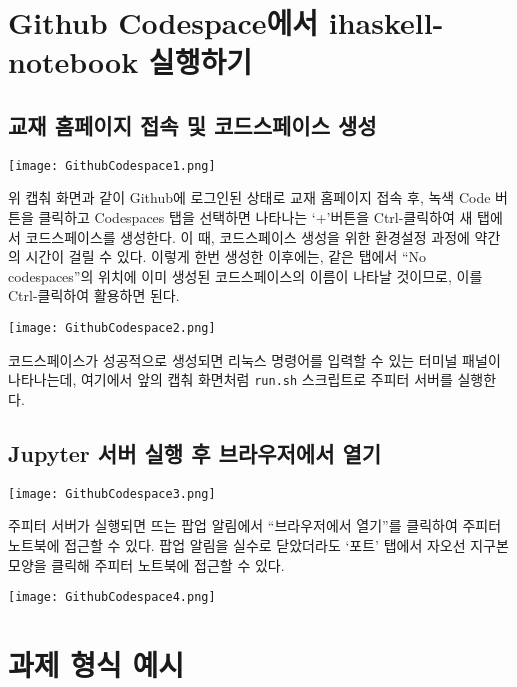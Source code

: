 \printbibliography[title=참고문헌]

\AppendixTitleToToc
\AttachAppendixTitleToSecnum

\appendix
\appendixpage*


\section{Github Codespace에서 ihaskell-notebook 실행하기}
\label{sec:codespace}

\subsection{교재 홈페이지 접속 및 코드스페이스 생성}
\begin{center}
\texttt{[image: GithubCodespace1.png]}
\end{center}
위 캡춰 화면과 같이 Github에 로그인된 상태로 교재 홈페이지 접속 후,
녹색 Code 버튼을 클릭하고 Codespaces 탭을 선택하면 나타나는
`+'버튼을 Ctrl-클릭하여 새 탭에서 코드스페이스를 생성한다.
이 때, 코드스페이스 생성을 위한 환경설정 과정에 약간의 시간이 걸릴 수 있다.
이렇게 한번 생성한 이후에는, 같은 탭에서 ``No codespaces''의 위치에
이미 생성된 코드스페이스의 이름이 나타날 것이므로,
이를 Ctrl-클릭하여 활용하면 된다.

\begin{center}
\texttt{[image: GithubCodespace2.png]}
\end{center}
코드스페이스가 성공적으로 생성되면 리눅스 명령어를 입력할 수 있는
터미널 패널이 나타나는데, 여기에서 앞의 캡춰 화면처럼
\texttt{run.sh} 스크립트로 주피터 서버를 실행한다.

\subsection{Jupyter 서버 실행 후 브라우저에서 열기}
\begin{center}
\texttt{[image: GithubCodespace3.png]}
\end{center}
주피터 서버가 실행되면 뜨는 팝업 알림에서 ``브라우저에서 열기''를 클릭하여
주피터 노트북에 접근할 수 있다. 팝업 알림을 실수로 닫았더라도
 `포트' 탭에서 자오선 지구본 모양을 클릭해 주피터 노트북에 접근할 수 있다.
\begin{center}
\texttt{[image: GithubCodespace4.png]}
\end{center}

\newpage

\section{과제 형식 예시}


